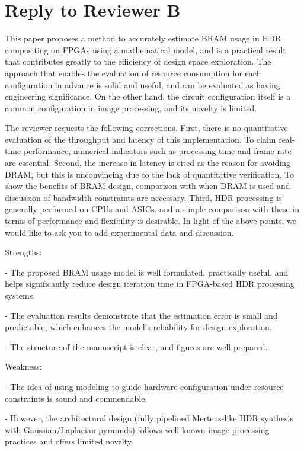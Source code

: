 \documentclass[a4j]{jsarticle}
\begin{document}
\section*{Reply to Reviewer B}
\begin{screen}
This paper proposes a method to accurately estimate BRAM usage in HDR compositing on FPGAs using a mathematical model, and is a practical result that contributes greatly to the efficiency of design space exploration. The approach that enables the evaluation of resource consumption for each configuration in advance is solid and useful, and can be evaluated as having engineering significance. On the other hand, the circuit configuration itself is a common configuration in image processing, and its novelty is limited.

The reviewer requests the following corrections. First, there is no quantitative evaluation of the throughput and latency of this implementation. To claim real-time performance, numerical indicators such as processing time and frame rate are essential. Second, the increase in latency is cited as the reason for avoiding DRAM, but this is unconvincing due to the lack of quantitative verification. To show the benefits of BRAM design, comparison with when DRAM is used and discussion of bandwidth constraints are necessary. Third, HDR processing is generally performed on CPUs and ASICs, and a simple comparison with these in terms of performance and flexibility is desirable. In light of the above points, we would like to ask you to add experimental data and discussion.

Strengths:

- The proposed BRAM usage model is well formulated, practically useful, and helps significantly reduce design iteration time in FPGA-based HDR processing systems.

- The evaluation results demonstrate that the estimation error is small and predictable, which enhances the model's reliability for design exploration.

- The structure of the manuscript is clear, and figures are well prepared.

Weakness:

- The idea of using modeling to guide hardware configuration under resource constraints is sound and commendable.

- However, the architectural design (fully pipelined Mertens-like HDR synthesis with Gaussian/Laplacian pyramids) follows well-known image processing practices and offers limited novelty.
\end{screen}
\end{document}
